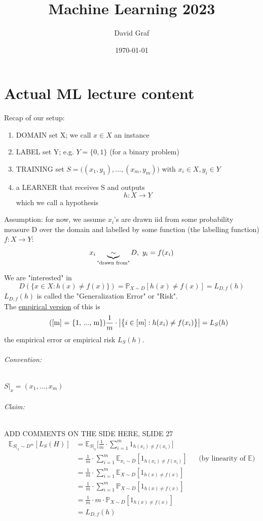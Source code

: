 \documentclass[10pt,a4paper]{article}
\title{Machine Learning 2023}
\author{David Graf}
\date{\today}
\theoremstyle{definition}
\theoremstyle{plain}
\begin{document}
	\maketitle
\part{Actual ML lecture content}
Recap of our setup:
\begin{enumerate}
	\item DOMAIN set X; we call $x\in X$ an instance
	\item LABEL set Y; e.g. $Y = \{0, 1\}$ (for a binary problem)
	\item TRAINING set $S = \big((x_1, y_1), ..., (x_m, y_m)\big)$  with $x_i \in X, y_i \in Y$
	\item a LEARNER that receives S and outputs 
	$$ h: X \to Y$$
	which we call a hypothesis
\end{enumerate}
Assumption: for now, we assume $x_i$'s are drawn iid from some probability measure D over the domain and labelled by some function (the labelling function) $f: X \to Y$:
$$ x_i \underbrace{ \sim }_{\text{\scriptsize"drawn from"}} D,\ y_i = f(x_i)$$

We are "interested" in 
$$D(\{x \in X: h(x) \neq f(x) \}) = \mathbb{P}_{X \sim D}[h(x) \neq f(x)] = L_{D, f}(h)$$
$L_{D, f}(h)$ is called the "Generalization Error" or "Risk".\\
The \underline{empirical version} of this is 
\begin{equation}
	\tag{[m] = \{1, ..., m\}}
	\frac{1}{m}\cdot\big|\big\{ i \in [m]: h(x_i) \neq f(x_i) \big\}\big| = L_S(h)
\end{equation}
the empirical error or empirical risk $L_S(h)$.
\paragraph{Convention:}
$S|_x = (x_1,..., x_m)$

\paragraph{Claim:}
ADD COMMENTS ON THE SIDE HERE, SLIDE 27
\begin{align*}
 \mathbb{E}_{S|_x \sim D^m}[L_S(H)] &= \mathbb{E}_{S|_x}\big[\frac{1}{m} \cdot \sum_{i=1}^{m} 1_{h(x_i) \neq f(x_i)}\big]\\
 &= \frac{1}{m} \cdot \sum_{i=1}^{m} \mathbb{E}_{x_i \sim D}[1_{h(x_i) \neq f(x_i)}] && \text{(by linearity of $\mathbb{E}$)}\\
 &= \frac{1}{m} \cdot \sum_{i=1}^{m} \mathbb{E}_{X \sim D}[1_{h(x) \neq f(x)}]\\
 &= \frac{1}{m} \cdot \sum_{i=1}^{m} \mathbb{P}_{X\sim D}[1_{h(x) \neq f(x)}]\\
 &=  \frac{1}{m} \cdot m \cdot \mathbb{P}_{X\sim D}[1_{h(x) \neq f(x)}]\\
 &= L_{D,f}(h)
\end{align*}
\end{document}
